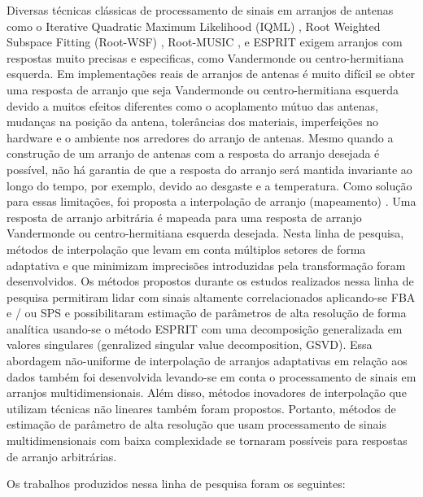 \documentclass[12pt]{report}
\begin{document}
Diversas técnicas clássicas de processamento de sinais em arranjos de antenas como o Iterative
Quadratic Maximum Likelihood (IQML) \cite{Bresler1986},  Root Weighted Subspace Fitting (Root-WSF)
\cite{Stoica1990a}, Root-MUSIC \cite{Barabell1983}, e ESPRIT \cite{Roy1989} exigem arranjos com respostas muito precisas e especificas, como Vandermonde ou centro-hermitiana esquerda. Em implementações reais de arranjos de antenas é muito difícil se obter uma resposta de arranjo que seja Vandermonde ou centro-hermitiana esquerda devido a muitos efeitos diferentes como o acoplamento mútuo das antenas, mudanças na posição da antena, tolerâncias dos materiais, imperfeições no hardware e o ambiente nos arredores do arranjo de antenas. Mesmo quando a construção de um arranjo de antenas com a resposta do arranjo desejada é possível, não há garantia de que a resposta do arranjo será mantida invariante ao longo do tempo, por exemplo, devido ao desgaste e a temperatura. Como solução para essas limitações, foi proposta a interpolação de arranjo (mapeamento) \cite{Bronez1988}. Uma resposta de arranjo arbitrária é mapeada para uma resposta de arranjo Vandermonde ou centro-hermitiana esquerda desejada. Nesta linha de pesquisa, métodos de interpolação que levam em conta múltiplos setores de forma adaptativa e que minimizam imprecisões introduzidas pela transformação foram desenvolvidos. Os métodos propostos durante os estudos realizados nessa linha de pesquisa permitiram lidar com sinais altamente correlacionados aplicando-se FBA \cite{Pillai1989} e / ou SPS \cite{Evans1982} e possibilitaram estimação de parâmetros de alta resolução de forma analítica usando-se o método ESPRIT com uma decomposição generalizada em valores singulares (genralized singular value decomposition, GSVD). Essa abordagem não-uniforme de interpolação de arranjos adaptativas em relação aos dados também foi desenvolvida levando-se em conta o processamento de sinais em arranjos multidimensionais. Além disso, métodos inovadores de interpolação que utilizam técnicas não lineares também foram propostos. Portanto, métodos de estimação de parâmetro de alta resolução que usam processamento de sinais multidimensionais com baixa complexidade se tornaram possíveis para respostas de arranjo arbitrárias.

Os trabalhos produzidos nessa linha de pesquisa foram os seguintes:









\newpage
{}



\end{document}
